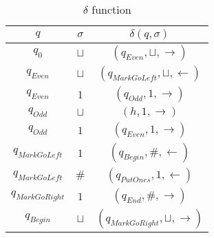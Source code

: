 \documentclass[12pt]{article}
\begin{document}
\begin{table}[H]\caption{$\delta$ function}\label{table:delta}
\begin{center}
\begin{tabular}{ | c | c | c | }
\hline
$q$ & $\sigma$ & $\delta(q, \sigma)$\\
\hline
$q_0$ & $\sqcup$ & $(q_{Even}, \sqcup, \rightarrow)$\\
\hline
$q_{Even}$ & $\sqcup$ & $(q_{MarkGoLeft}, \sqcup, \leftarrow)$\\
\hline
$q_{Even}$ & $1$ & $(q_{Odd}, 1, \rightarrow)$\\
\hline
$q_{Odd}$ & $\sqcup$ & $(h, 1, \rightarrow)$\\
\hline
$q_{Odd}$ & $1$ & $(q_{Even}, 1, \rightarrow)$\\
\hline
$q_{MarkGoLeft}$ & $1$ & $(q_{Begin}, \#, \leftarrow)$\\
\hline
$q_{MarkGoLeft}$ & $\#$ & $(q_{PutOnes}, 1, \leftarrow)$\\
\hline
$q_{MarkGoRight}$ & $1$ & $(q_{End}, \#, \rightarrow)$\\
\hline
$q_{Begin}$ & $\sqcup$ & $(q_{MarkGoRight}, \sqcup, \rightarrow)$\\

\end{tabular}
\end{center}
\end{table}
\end{document}
